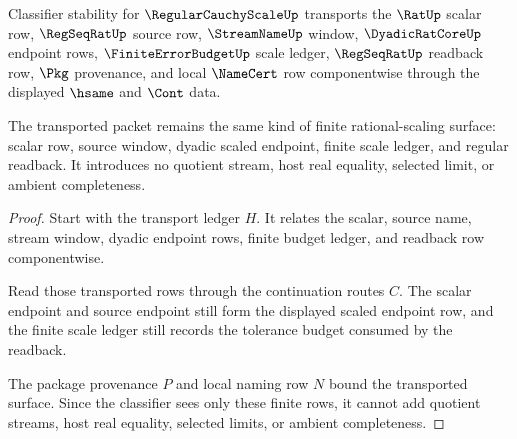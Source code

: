 \begin{theorem}
\label{thm:regularcauchyscale-classifier-stability-obligation}
Classifier stability for $\RegularCauchyScaleUp$ transports the $\RatUp$ scalar row, $\RegSeqRatUp$ source row, $\StreamNameUp$ window, $\DyadicRatCoreUp$ endpoint rows, $\FiniteErrorBudgetUp$ scale ledger, $\RegSeqRatUp$ readback row, $\Pkg$ provenance, and local $\NameCert$ row componentwise through the displayed $\hsame$ and $\Cont$ data.

The transported packet remains the same kind of finite rational-scaling surface: scalar row, source window, dyadic scaled endpoint, finite scale ledger, and regular readback. It introduces no quotient stream, host real equality, selected limit, or ambient completeness.
\end{theorem}
\begin{proof}
Start with the transport ledger $H$. It relates the scalar, source name, stream window, dyadic endpoint rows, finite budget ledger, and readback row componentwise.

Read those transported rows through the continuation routes $C$. The scalar endpoint and source endpoint still form the displayed scaled endpoint row, and the finite scale ledger still records the tolerance budget consumed by the readback.

The package provenance $P$ and local naming row $N$ bound the transported surface. Since the classifier sees only these finite rows, it cannot add quotient streams, host real equality, selected limits, or ambient completeness.
\end{proof}

